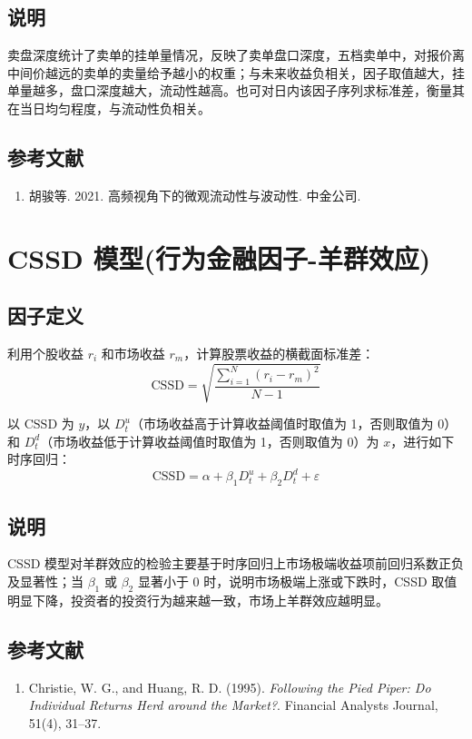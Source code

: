 \documentclass{article}
\begin{document}
\subsection{说明}
卖盘深度统计了卖单的挂单量情况，反映了卖单盘口深度，五档卖单中，对报价离中间价越远的卖单的卖量给予越小的权重；与未来收益负相关，因子取值越大，挂单量越多，盘口深度越大，流动性越高。也可对日内该因子序列求标准差，衡量其在当日均匀程度，与流动性负相关。

\subsection{参考文献}
\begin{enumerate}
    \item 胡骏等. 2021. 高频视角下的微观流动性与波动性. 中金公司.
\end{enumerate}

\section{CSSD 模型(行为金融因子-羊群效应)}

\subsection{因子定义}
利用个股收益 \( r_i \) 和市场收益 \( r_m \)，计算股票收益的横截面标准差：
\begin{equation}
    \mathrm{CSSD} = \sqrt{\frac{\sum_{i=1}^N (r_i - r_m)^2}{N-1}}
\end{equation}

以 \(\mathrm{CSSD}\) 为 \( y \)，以 \( D_t^u \)（市场收益高于计算收益阈值时取值为 1，否则取值为 0）和 \( D_t^d \)（市场收益低于计算收益阈值时取值为 1，否则取值为 0）为 \( x \)，进行如下时序回归：
\begin{equation}
    \mathrm{CSSD} = \alpha + \beta_1 D_t^u + \beta_2 D_t^d + \varepsilon
\end{equation}

\subsection{说明}
CSSD 模型对羊群效应的检验主要基于时序回归上市场极端收益项前回归系数正负及显著性；当 \( \beta_1 \) 或 \( \beta_2 \) 显著小于 0 时，说明市场极端上涨或下跌时，CSSD 取值明显下降，投资者的投资行为越来越一致，市场上羊群效应越明显。

\subsection{参考文献}
\begin{enumerate}
    \item Christie, W. G., and Huang, R. D. (1995). \textit{Following the Pied Piper: Do Individual Returns Herd around the Market?}. Financial Analysts Journal, 51(4), 31–37.
\end{enumerate}
\end{document}
